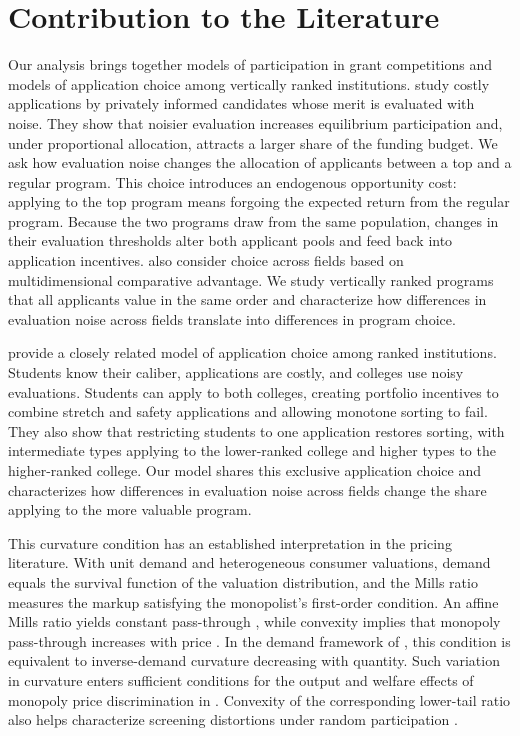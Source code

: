 \documentclass[12pt,reqno]{amsart}
\theoremstyle{definition}
\theoremstyle{plain} %
\begin{document}
\section{Contribution to the Literature}\label{section:litreview}
\noindent Our analysis brings together models of participation in grant competitions and models of application choice among vertically ranked institutions. \cite{adda2024grantmaking} study costly applications by privately informed candidates whose merit is evaluated with noise. They show that noisier evaluation increases equilibrium participation and, under proportional allocation, attracts a larger share of the funding budget. We ask how evaluation noise changes the allocation of applicants between a top and a regular program. This choice introduces an endogenous opportunity cost: applying to the top program means forgoing the expected return from the regular program. Because the two programs draw from the same population, changes in their evaluation thresholds alter both applicant pools and feed back into application incentives. \citeauthor{adda2024grantmaking} also consider choice across fields based on multidimensional comparative advantage. We study vertically ranked programs that all applicants value in the same order and characterize how differences in evaluation noise across fields translate into differences in program choice.

\cite{chade2014student} provide a closely related model of application choice among ranked institutions. Students know their caliber, applications are costly, and colleges use noisy evaluations. Students can apply to both colleges, creating portfolio incentives to combine stretch and safety applications and allowing monotone sorting to fail. They also show that restricting students to one application restores sorting, with intermediate types applying to the lower-ranked college and higher types to the higher-ranked college. Our model shares this exclusive application choice and characterizes how differences in evaluation noise across fields change the share applying to the more valuable program.

\noindent This curvature condition has an established interpretation in the pricing literature. With unit demand and heterogeneous consumer valuations, demand equals the survival function of the valuation distribution, and the Mills ratio measures the markup satisfying the monopolist’s first-order condition. An affine Mills ratio yields constant pass-through \citep{bulow1983note}, while convexity implies that monopoly pass-through increases with price \citep{weyl2013passthrough}. In the demand framework of \citet{mrazova2017demanding}, this condition is equivalent to inverse-demand curvature decreasing with quantity. Such variation in curvature enters sufficient conditions for the output and welfare effects of monopoly price discrimination in \citet*{aguirre2010monopoly}. Convexity of the corresponding lower-tail ratio also helps characterize screening distortions under random participation \citep{rochet2002nonlinear}.
\end{document}
